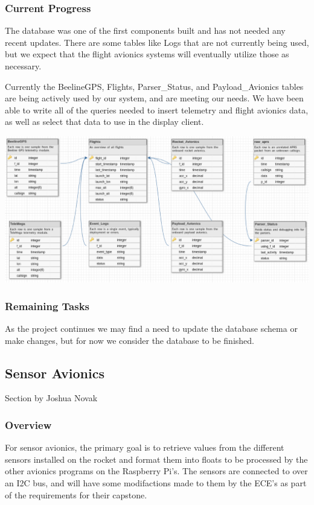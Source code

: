 \documentclass[onecolumn, draftclsnofoot, 10pt, compsoc]{IEEEtran}
\begin{document}
\subsubsection{Current Progress}
The database was one of the first components built and has not needed any recent updates.  There are some tables like Logs that are not currently being used, but we expect that the flight avionics systems will eventually utilize those as necessary.

Currently the BeelineGPS, Flights, Parser\_Status, and Payload\_Avionics tables are being actively used by our system, and are meeting our needs. We have been able to write all of the queries needed to insert telemetry and flight avionics data, as well as select that data to use in the display client.

\begin{center}
	\includegraphics[width=.8\textwidth]{images/database_schema_v102.eps}
    \label{database-schema}
\end{center}

\subsubsection{Remaining Tasks}
As the project continues we may find a need to update the database schema or make changes, but for now we consider the database to be finished.

\subsection{Sensor Avionics}
Section by Joshua Novak
\subsubsection{Overview}
For sensor avionics, the primary goal is to retrieve values from the different sensors installed on the rocket and format them into floats to be processed by the other avionics programs on the Raspberry Pi's. The sensors are connected to over an I2C bus, and will have some modifactions made to them by the ECE's as part of the requirements for their capstone.
\end{document}
